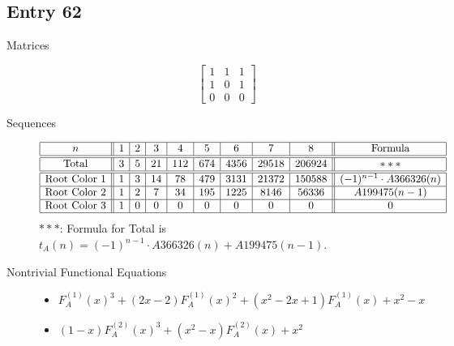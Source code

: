 \documentclass[12pt]{amsart}
\newcommand{\gff}[2]{F_{#2}^{(#1)}(x)}
\newcommand{\gfa}[1]{\gff{#1}{A}}
\begin{document}
\subsection*{Entry 62}
\begin{description}
    \item[Matrices]
    
    \[\begin{bmatrix}
1 & 1 & 1 \\
1 & 0 & 1 \\
0 & 0 & 0
\end{bmatrix}\]
    \item[Sequences]\hspace*{\fill}\vspace{-0.5cm}
    \begin{center}
        \[
        \begin{array}{|c||c|c|c|c|c|c|c|c||c|}\hline
           n  & 1 & 2 & 3 & 4 & 5 & 6 & 7 & 8  & \text{Formula}\\\hline\hline
           \text{Total}  & 3 & 5 & 21 & 112 & 674 & 4356 & 29518 & 206924 & ***\\\hline\hline
           \text{Root Color }1 & 1 & 3 & 14 & 78 & 479 & 3131 & 21372 & 150588 & (-1)^{n-1}\cdot A366326(n)\\\hline
           \text{Root Color }2 & 1 & 2 & 7 & 34 & 195 & 1225 & 8146 & 56336 & A199475(n-1)\\\hline
           \text{Root Color }3 & 1 & 0 & 0 & 0 & 0 & 0 & 0 & 0 & 0\\\hline
        \end{array}
        \]
        $***$: Formula for Total is $t_A(n)=(-1)^{n-1}\cdot A366326(n) + A199475(n-1)$.
    \end{center}
    
    \item[Nontrivial Functional Equations]\hspace*{\fill}

    \begin{itemize}
\item $\gfa{1}^3+(2x - 2)\gfa{1}^2+(x^2 - 2x + 1)\gfa{1}+x^2 - x$


\item $(1 - x)\gfa{2}^3+(x^2 - x)\gfa{2}+x^2$



\end{itemize}
\end{description}
\end{document}

